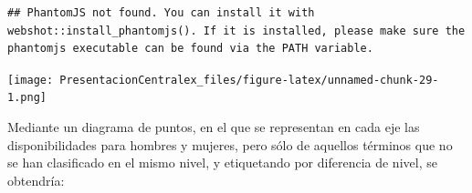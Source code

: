 \documentclass[
]{article}
\newenvironment{Shaded}{\begin{snugshade}}{\end{snugshade}}
\newcommand{\DataTypeTok}[1]{\textcolor[rgb]{0.13,0.29,0.53}{#1}}
\newcommand{\KeywordTok}[1]{\textcolor[rgb]{0.13,0.29,0.53}{\textbf{#1}}}
\newcommand{\NormalTok}[1]{#1}
\newcommand{\OperatorTok}[1]{\textcolor[rgb]{0.81,0.36,0.00}{\textbf{#1}}}
\newcommand{\StringTok}[1]{\textcolor[rgb]{0.31,0.60,0.02}{#1}}
\begin{document}
\begin{verbatim}
## PhantomJS not found. You can install it with webshot::install_phantomjs(). If it is installed, please make sure the phantomjs executable can be found via the PATH variable.
\end{verbatim}

\texttt{[image: PresentacionCentralex\_files/figure-latex/unnamed-chunk-29-1.png]}

Mediante un diagrama de puntos, en el que se representan en cada eje las
disponibilidades para hombres y mujeres, pero sólo de aquellos términos
que no se han clasificado en el mismo nivel, y etiquetando por
diferencia de nivel, se obtendría:

\begin{Shaded}
\end{Shaded}
\end{document}
